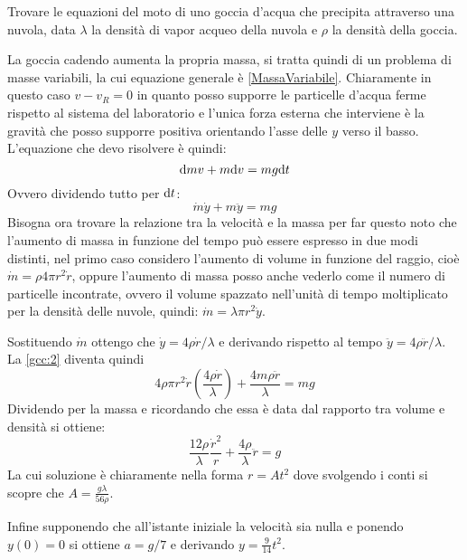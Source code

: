 \documentclass[../main.tex]{subfiles}
\begin{document}

\textex
Trovare le equazioni del moto di uno goccia d'acqua che precipita attraverso una nuvola, data $\lambda$ la densità di vapor acqueo della nuvola e $\rho$
la densità della goccia.

\solution

La goccia cadendo aumenta la propria massa, si tratta quindi di un problema di masse variabili, la cui equazione generale è \cref{MassaVariabile}.
Chiaramente in questo caso $v-v_{R}=0$ in quanto posso supporre le particelle d'acqua ferme rispetto al sistema del laboratorio e
l'unica forza esterna che interviene è la gravità che posso supporre positiva orientando l'asse delle $y$ verso il basso.
L'equazione che devo risolvere è quindi:
\begin{equation*}\label{gcc:1}
\mathrm{d} mv+m\mathrm{d} v=mg\mathrm{d} t 
\end{equation*}
Ovvero dividendo tutto per $\mathrm{d} t$:
\begin{equation}\label{gcc:2}
 \dot{m}\dot{y}+m\ddot{y}=mg
\end{equation}
Bisogna ora trovare la relazione tra la velocità e la massa per far questo noto che l'aumento di massa in funzione del tempo può essere espresso in due modi distinti,
nel primo caso considero l'aumento di volume in funzione del raggio, cioè $\dot{m}=\rho 4 \pi r^2 \dot{r}$, oppure l'aumento di massa posso anche vederlo
come il numero di particelle incontrate, ovvero il volume spazzato nell'unità di tempo moltiplicato per la densità delle nuvole, quindi:
$\dot{m}=\lambda \pi r^2 \dot{y}$. 

Sostituendo $\dot{m}$ ottengo che $\dot{y}=4\rho \dot{r}/{\lambda}$ e derivando rispetto al tempo $\ddot{y}=4\rho \ddot{r}/\lambda$. La \cref{gcc:2} diventa quindi
\begin{equation*}\label{gcc:3}
 4\rho \pi r^2 \dot{r} (\frac{4 \rho \dot{r}}{\lambda})+\frac{4m\rho \ddot{r}}{\lambda}=mg
\end{equation*}
Dividendo per la massa e ricordando che essa è data dal rapporto tra volume e densità si ottiene:
\begin{equation*}\label{gcc:4}
 \frac{12\rho}{\lambda}\frac{\dot{r}^2}{r}+\frac{4\rho}{\lambda}\ddot{r}=g
\end{equation*}
La cui soluzione è chiaramente nella forma $r=At^2$ dove svolgendo i conti si scopre che $A=\frac{g \lambda}{56 \rho}$.

Infine supponendo che all'istante iniziale la velocità sia nulla e ponendo $y(0)=0$ si ottiene $a=g/7$ e derivando $y=\frac{9}{14}t^2$.
\end{document}
